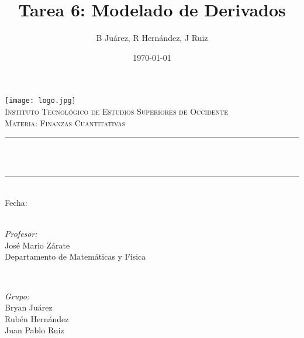 \documentclass[12pt]{article}
\title{Tarea 6: Modelado de Derivados}								%
\author{B Juárez, R Hernández, J Ruiz}								%
\date{\today{}}											%
\makeatletter
\let\thetitle\@title
\let\thedate\@date
\makeatother
\begin{document}

\begin{titlepage}
	\centering
    \vspace*{0.5 cm}
    \texttt{[image: logo.jpg]}\\[1.0 cm]	%
    \textsc{\LARGE \newline\newline Instituto Tecnológico de Estudios Superiores de Occidente}\\[2.0 cm]	%
	\textsc{\Large Materia: Finanzas Cuantitativas }\\[0.5 cm]				%
	\rule{\linewidth}{0.2 mm} \\[0.4 cm]
	{\bfseries \thetitle }\\ 
	\rule{\linewidth}{0.2 mm} \\[1.5 cm]
	
	Fecha:\\ \thedate\\
	\begin{minipage}{0.5\textwidth}
		\begin{flushleft} \large
			\emph{Profesor:}\\
			José Mario Zárate\\
            Departamento de Matemáticas y Física\\
			\end{flushleft}
			\end{minipage}~
			\begin{minipage}{0.4\textwidth}
            
			\begin{flushright} \large
			\emph{Grupo:} \\
			Bryan Juárez\\
            Rubén Hernández\\
            Juan Pablo Ruiz
		\end{flushright}
		

        
	\end{minipage}\\[2 cm]
	
	
    
    
    
    
	
\end{titlepage}

\end{document}
